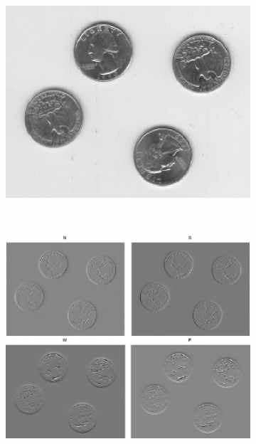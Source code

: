 \documentclass[12pt]{article}
\newif\ifdebug
\newcommand{\todo}[1]{\ifdebug \textcolor{red}{\textit{\textbf{TODO:}} #1}\else \fi}    %
\begin{document}
\begin{figure}[tb]
  \centering

  \begin{subfigure}[b]{0.46\textwidth}
        \includegraphics[width=\textwidth]{img/values_init.jpg}
        \caption{}\label{fig:dart_values_init}
    \end{subfigure}
    ~
    \begin{subfigure}[b]{0.45\textwidth}
        \includegraphics[width=\textwidth]{img/values_new.jpg}
        \caption{}\label{fig:dart_values_news}
    \end{subfigure}

  \caption{\todo{caption}}\label{fig:dart_values}
\end{figure}
\end{document}
